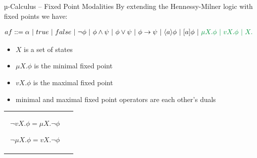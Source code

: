\documentclass[aspectratio=1610]{beamer}
\begin{document}
  \begin{frame}{µ-Calculus – Fixed Point Modalities}
    By extending the Hennessy-Milner logic with fixed points we have:
    \resizebox{ \textwidth}{!} {
      \begin{minipage}{\textwidth}
        \begin{align*}
          af ::= \alpha\ |\ true\ |\ false\ |\ \neg \phi\ |\ \phi \land \psi\ |\ \phi \lor \psi\ |\ \phi \to \psi\ |\ \langle a \rangle \phi \ |\ [a]\phi\ |\ \color{green} \mu X. \phi \ |\ vX. \phi \ |\ X.
        \end{align*}
      \end{minipage}
    }
    \begin{itemize}
      \item $X$ is a set of states
      \item $\mu X. \phi$ is the minimal fixed point
      \item $vX. \phi$ is the maximal fixed point
      \item minimal and maximal fixed point operators are each other's duals
    \end{itemize}
    \begin{tabular}{cc}
      \begin{minipage}{.47\linewidth}
        \begin{align*}
          \neg vX. \phi = \mu X. \neg \phi
        \end{align*}
      \end{minipage}
      \begin{minipage}{.47\linewidth}
        \begin{align*}
          \neg \mu X. \phi = vX. \neg \phi
        \end{align*}
      \end{minipage}
    \end{tabular}
  \end{frame}
\end{document}
